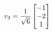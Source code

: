 \documentclass[preview]{standalone}
\begin{document}
\begin{align*}
\special{dvisvgm:raw <g id='unique000'>}v_3 = \frac{1}{\sqrt{6}} \begin{bmatrix} -1 \\ -2 \\ 1 \end{bmatrix}\special{dvisvgm:raw </g>}
\end{align*}
\end{document}
